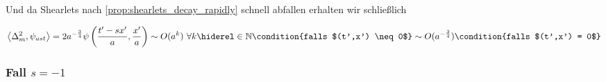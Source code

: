 Und da Shearlets nach \cref{prop:shearlets_decay_rapidly} schnell abfallen erhalten wir schließlich

\begin{dmath}
    \left\langle \Delta_m^{2}, \psi_{ast}\right\rangle
    = 2 a^{-\frac{3}{4}} \psi \left(\frac{t'-sx'}{a}, \frac{x'}{a}\right)
    \sim O(a^k) ~\forall k \hiderel \in \mathbb{N} \condition{falls $(t',x') \neq 0$}
    \sim O(a^{-\frac{3}{4}}) \condition{falls $(t',x') = 0$}
\label{eq:delta_m2_s<1}
\end{dmath}

\subsubsection*{\texorpdfstring{Fall $s = -1$}{Fall s = 1}}


